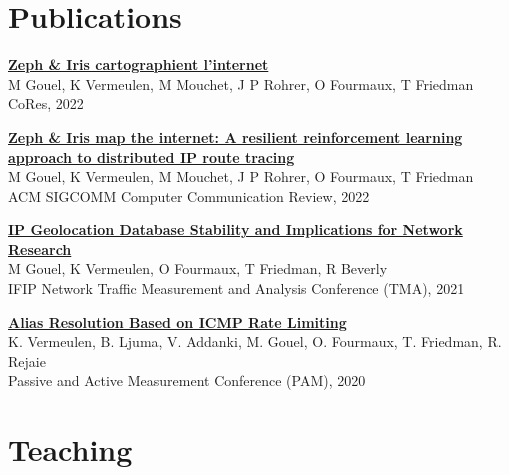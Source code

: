 \documentclass[11pt,a4paper,sans]{moderncv} %
\begin{document}

\section{Publications}

\href{}{}

\href{https://hal.archives-ouvertes.fr/hal-03656974/document}{\textbf{Zeph \& Iris cartographient l’internet}}\\
M Gouel, K Vermeulen, M Mouchet, J P Rohrer, O Fourmaux, T Friedman\\
CoRes, 2022

\vspace{0.25cm}
\href{https://hal.archives-ouvertes.fr/hal-03597580/document}{\textbf{Zeph \& Iris map the internet: A resilient reinforcement learning approach to distributed IP route tracing}}\\
M Gouel, K Vermeulen, M Mouchet, J P Rohrer, O Fourmaux, T Friedman\\
ACM SIGCOMM Computer Communication Review, 2022

\vspace{0.25cm}
\href{https://dl.ifip.org/db/conf/tma/tma2021/tma2021-paper2.pdf}{\textbf{IP Geolocation Database Stability and Implications for Network Research}}\\
M Gouel, K Vermeulen, O Fourmaux, T Friedman, R Beverly\\
IFIP Network Traffic Measurement and Analysis Conference (TMA), 2021

\vspace{0.25cm}
\href{https://arxiv.org/pdf/2002.00252.pdf}{\textbf{Alias Resolution Based on ICMP Rate Limiting}} \\
K. Vermeulen, B. Ljuma, V. Addanki, M. Gouel, O. Fourmaux, T. Friedman, R. Rejaie\\
Passive and Active Measurement Conference (PAM), 2020


\section{Teaching}
\end{document}
